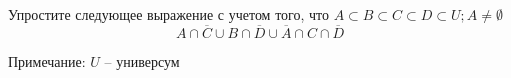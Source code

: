 \question
Упростите следующее выражение с учетом того, что $A\subset B \subset C \subset D \subset U; A \neq \emptyset$
\begin{equation*}
	A \cap  \overline{C} \cup B \cap \overline{D} \cup  \overline{A} \cap C \cap  \overline{D}
\end{equation*}

Примечание: $U$ -- универсум